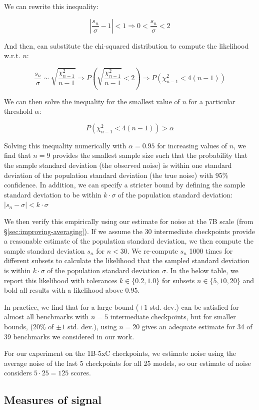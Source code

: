 We can rewrite this inequality:

$$\left| \frac{s_n}{\sigma} - 1 \right| < 1 \Rightarrow 0 < \frac{s_n}{\sigma} < 2$$

And then, can substitute the chi-squared distribution to compute the likelihood w.r.t. $n$:

$$\frac{s_n}{\sigma} \sim \sqrt{\frac{\chi^2_{n-1}}{n-1}} \Rightarrow P\left( \sqrt{\frac{\chi^2_{n-1}}{n-1}} < 2 \right) \Rightarrow P\left( \chi^2_{n-1} < 4(n-1) \right)$$

We can then solve the inequality for the smallest value of $n$ for a particular threshold $\alpha$:

$$P\left( \chi^2_{n-1} < 4(n-1) \right)>\alpha$$

Solving this inequality numerically with $\alpha=0.95$ for increasing values of $n$, we find that $n=9$ provides the smallest sample size such that the probability that the sample standard deviation (the observed noise) is within one standard deviation of the population standard deviation (the true noise) with 95\% confidence. In addition, we can specify a stricter bound by defining the sample standard deviation to be within $k\cdot \sigma$ of the population standard deviation: $|s_n - \sigma| < k\cdot \sigma$

We then verify this empirically using our estimate for noise at the 7B scale (from \S\ref{sec:improving-averaging}). If we assume the 30 intermediate checkpoints provide a reasonable estimate of the population standard deviation, we then compute the sample standard deviation $s_n$ for $n < 30$. We re-compute $s_n$ 1000 times for different subsets to calculate the likelihood that the sampled standard deviation is within $k\cdot \sigma$ of the population standard deviation $\sigma$. In the below table, we report this likelihood with tolerances $k\in \{0.2, 1.0\}$ for subsets $n\in \{5, 10, 20\}$ and bold all results with a likelihood above $0.95$.

In practice, we find that for a large bound ($\pm 1$ std. dev.) can be satisfied for almost all benchmarks with $n=5$ intermediate checkpoints, but for smaller bounds, (20\% of $\pm 1$ std. dev.), using $n=20$ gives an adequate estimate for 34 of 39 benchmarks we considered in our work.

For our experiment on the 1B-5xC checkpoints, we estimate noise using the average noise of the last 5 checkpoints for all 25 models, so our estimate of noise considers $5\cdot 25=125$ scores.


\subsection{Measures of signal{}}
\label{app:measuring-signal}

